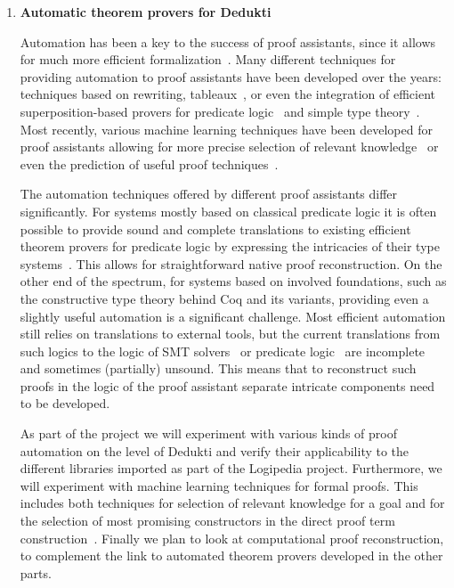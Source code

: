 \begin{enumerate}[\bf(a)]
\item{\bf Automatic theorem provers for Dedukti}

  Automation has been a key to the success of proof assistants, since it
allows for much more efficient formalization~\cite{Hales-Developments}.
Many different techniques for providing automation to proof assistants have
been developed over the years: techniques based on rewriting,
tableaux~\cite{Paulson-blast}, or even the integration of efficient
superposition-based provers for predicate logic~\cite{hurd-metis} and
simple type theory~\cite{asperti-matita-paramodulation}. Most
recently, various machine learning techniques have been developed for
proof assistants allowing for more precise selection of relevant
knowledge~\cite{blanchette-h4qed-jfr} or even the prediction of useful
proof techniques~\cite{gauthier-tactictoe}.

The automation techniques offered by different proof assistants differ
significantly. For systems mostly based on classical predicate logic
it is often possible to provide sound and complete translations to
existing efficient theorem provers for predicate logic by
expressing the intricacies of their type
systems~\cite{kaliszyk-miz40}. This allows for straightforward native
proof reconstruction. On the other end of the spectrum, for
systems based on involved foundations, such
as the constructive type theory behind Coq and its variants,
providing even a slightly useful automation is a significant
challenge. Most efficient automation still relies on translations to
external tools, but the current translations from such logics to
the logic of SMT solvers~\cite{DBLP:conf/cpp/ArmandFGKTW11} or
predicate logic~\cite{DBLP:journals/jar/CzajkaK18} are incomplete
and sometimes (partially) unsound. This means that to reconstruct such
proofs in the logic of the proof assistant separate intricate
components need to be developed.

As part of the project we will experiment with various kinds of proof
automation on the level of Dedukti and verify their applicability to
the different libraries imported as part of the Logipedia project.
Furthermore, we will experiment with machine learning techniques for
formal proofs. This includes both techniques for selection of relevant
knowledge for a goal and for the selection of most promising
constructors in the direct proof term
construction~\cite{ZielenkiewiczSchubert2016}. Finally we plan to look
at computational proof reconstruction, to complement the link to
automated theorem provers developed in the other parts.


\end{enumerate}
